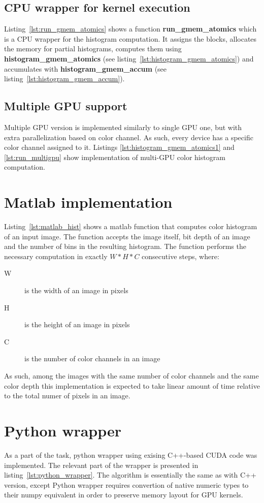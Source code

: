\documentclass{article}
\begin{document}
\subsection{CPU wrapper for kernel execution}
Listing~\ref{lst:run_gmem_atomics} shows a function \textbf{run\_gmem\_atomics}
which is a CPU wrapper for the histogram computation. It assigns the blocks,
allocates the memory for partial histograms, computes them using
\textbf{histogram\_gmem\_atomics} (see listing~\ref{lst:histogram_gmem_atomics})
and accumulates with \textbf{histogram\_gmem\_accum}
(see listing~\ref{lst:histogram_gmem_accum}).

\subsection{Multiple GPU support}
Multiple GPU version is implemented similarly to single GPU one, but with extra
parallelization based on color channel. As such, every device has a specific color
channel assigned to it. Listings \ref{lst:histogram_gmem_atomics1} and
\ref{lst:run_multigpu} show implementation of multi-GPU color histogram computation.

\section{Matlab implementation}
Listing~\ref{lst:matlab_hist} shows a matlab function that computes color histogram
of an input image. The function accepts the image itself, bit depth of an image and
the number of bins in the resulting histogram. The function performs the necessary
computation in exactly \(W*H*C\) consecutive steps, where:

\begin{description}
\item [W] is the width of an image in pixels
\item [H] is the height of an image in pixels
\item [C] is the number of color channels in an image
\end{description}

As such, among the images with the same number of color channels and the same color
depth this implementation is expected to take linear amount of time relative to
the total numer of pixels in an image.

\section{Python wrapper}
As a part of the task, python wrapper using exising C++-based CUDA code was
implemented. The relevant part of the wrapper is presented in
listing~\ref{lst:python_wrapper}. The algorithm is essentially the same as with C++
version, except Python wrapper requires convertion of native numeric types to their
numpy equivalent in order to preserve memory layout for GPU kernels.
\end{document}
